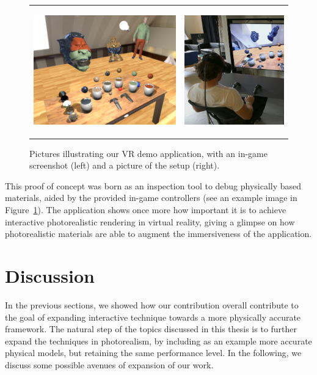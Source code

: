 \begin{figure}[t]
\centering
\begin{tabular}{@{}c@{}c@{}}
	 \includegraphics[height = 5.5cm]{figures/screen1_crop} &
		 \includegraphics[height = 5.5cm]{figures/person} \\[-2.5ex]
\end{tabular}
  \caption{Pictures illustrating our VR demo application, with an in-game screenshot (left) and a picture of the setup (right). }
  \label{fig:vrbrdfimage}
\end{figure}
\vspace{1em}
This proof of concept was born as an inspection tool to debug physically based materials, aided by the provided in-game controllers (see an example image in Figure~\ref{fig:vrbrdfimage}). The application shows once more how important it is to achieve interactive photorealistic rendering in virtual reality, giving a glimpse on how photorealistic materials are able to augment the immersiveness of the application. 

\section{Discussion}
In the previous sections, we showed how our contribution overall contribute to the goal of expanding interactive technique towards a more physically accurate framework. The natural step of the topics discussed in this thesis is to further expand the techniques in photorealism, by including as an example more accurate physical models, but retaining the same performance level. In the following, we discuss some possible avenues of expansion of our work.

